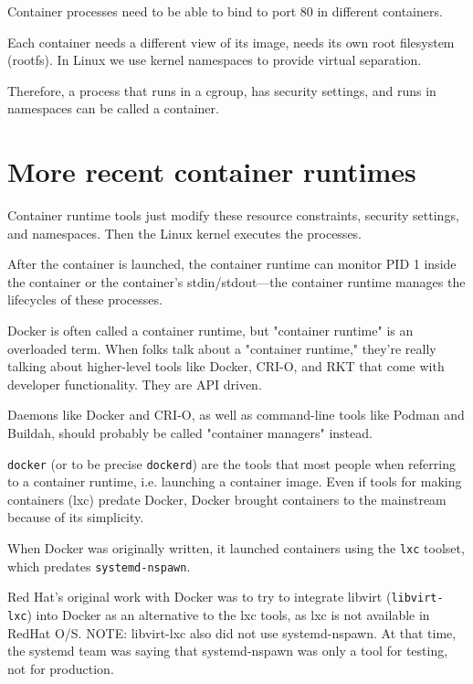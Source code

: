 Container processes need to be able to bind to port 80 in different containers.

Each container needs a different view of its image, needs its own root
filesystem (rootfs). In Linux we use kernel namespaces to provide virtual
separation.

Therefore, a process that runs in a cgroup, has security settings, and runs in
namespaces can be called a container.



\section{More recent container runtimes}


Container runtime tools just modify these resource constraints, security
settings, and namespaces. Then the Linux kernel executes the processes.

After the container is launched, the container runtime can monitor PID 1 inside
the container or the container's stdin/stdout—the container runtime manages the
lifecycles of these processes.

\begin{mdframed}

Docker is often called a container runtime, but "container runtime" is an
overloaded term. When folks talk about a "container runtime," they're really
talking about higher-level tools like Docker, CRI-O, and RKT that come with
developer functionality. They are API driven.

Daemons like Docker and CRI-O, as well as command-line tools like Podman and
Buildah, should probably be called "container managers" instead.

\end{mdframed}

\verb!docker! (or to be precise \verb!dockerd!) are the tools that most people
when referring to a container runtime, i.e. launching a container image. Even if
tools for making containers (lxc) predate Docker, Docker brought containers to
the mainstream because of its simplicity.

When Docker was originally written, it launched containers using the \verb!lxc!
toolset, which predates \verb!systemd-nspawn!.

Red Hat's original work with Docker was to try to integrate libvirt
(\verb!libvirt-lxc!) into Docker as an alternative to the lxc tools, as lxc is
not available in RedHat O/S. NOTE: libvirt-lxc also did not use systemd-nspawn.
At that time, the systemd team was saying that systemd-nspawn was only a tool
for testing, not for production.

